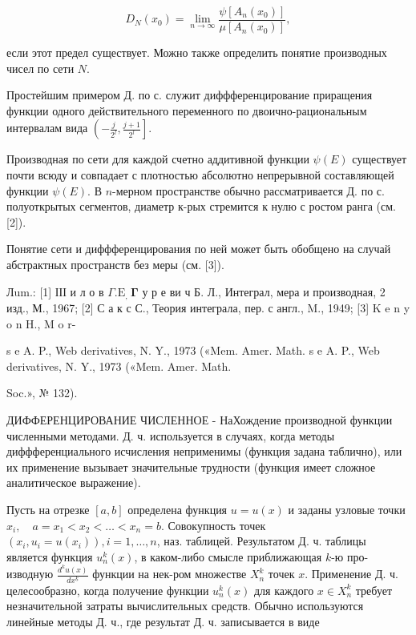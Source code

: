 \documentclass[10pt]{article}
\begin{document}
\[

D_{N}\left(x_{0}\right)=\lim _{n \rightarrow \infty} \frac{\psi\left[A_{n}\left(x_{0}\right)\right]}{\mu\left[A_{n}\left(x_{0}\right)\right]},

\]



если этот предел существует. Можно также определить понятие производных чисел по сети $N$.



Простейшим примером Д. по с. служит диффференцирование приращения функции одного действительного переменного по двоично-рациональным интервалам вида $\left(-\frac{j}{2^{l}}, \frac{j+1}{2^{l}}\right]$.



Производная по сети для каждой счетно аддитивной функции $\psi(E)$ существует почти всюду и совпадает с плотностью абсолютно непрерывной составляющей функции $\psi(E)$. В $n$-мерном пространстве обычно рассматривается Д. по с. полуоткрытых сегментов, диаметр к-рых стремится к нулю с ростом ранга (см. [2]).



Понятие сети и диффференцирования по ней может быть обобщено на случай абстрактных пространств без меры (см. [3]).



Лum.: [1] ІІІ и л о в $\Gamma . \mathrm{E}_{\text {, }} \boldsymbol{\Gamma}$ у р е ви ч Б. Л., Интеграл, мера и производная, 2 изд., М., 1967; [2] С а к с С., Теория интеграла, пер. с англ., M., 1949; [3] K e n y o n H., M o r-

s e A. P., Web derivatives, N. Y., 1973 («Mem. Amer. Math. s e A. P., Web derivatives, N. Y., 1973 («Mem. Amer. Math.

Soc.», № 132).



ДИФФЕРЕНЦИРОВАНИЕ ЧИСЛЕННОЕ - НаХождение производной функции численными методами. Д. ч. используется в случаях, когда методы диффференциального исчисления неприменимы (функция задана таблично), или их применение вызывает значительные трудности (функция имеет сложное аналитическое выражение).



Пусть на отрезке $[a, b]$ определена функция $u=u(x)$ и заданы узловые точки $x_{i}, \quad a=x_{1}<x_{2}<\ldots<x_{n}=b$. Совокупность точек $\left(x_{i}, u_{i}=u\left(x_{i}\right)\right), i=1, \ldots, n$, наз. таблицей. Результатом Д. ч. таблицы является функция $u_{n}^{k}(x)$, в каком-либо смысле приближающая $k$-ю про- изводную $\frac{d^{k} u(x)}{d x^{\underline{k}}}$ функции на нек-ром множестве $X_{n}^{k}$ точек $x$. Применение Д. ч. целесообразно, когда получение функции $u_{n}^{k}(x)$ для каждого $x \in X_{n}^{k}$ требует незначительной затраты вычислительных средств. Обычно используются линейные методы Д. ч., где результат Д. ч. записывается в виде
\end{document}
